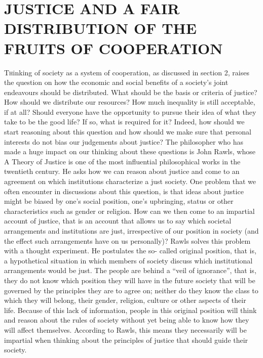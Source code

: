 \documentclass[11pt]{article}
\begin{document}
\section{JUSTICE AND A FAIR DISTRIBUTION OF THE FRUITS OF COOPERATION}
\lettrine[lines=3]{T}hinking of society as a system of cooperation, as discussed in section 2,
raises the question on how the economic and social benefits of a society’s joint endeavours should be distributed. What should be the basis or criteria of justice? How should we distribute our resources? How much inequality is still acceptable, if at all? Should everyone have the opportunity to pursue their idea of what they take to be the good life? If so, what is required for it? Indeed, how should we start reasoning about this question and how should we make sure that personal interests do not bias our judgements about justice?
The philosopher who has made a huge impact on our thinking about these questions is John Rawls, whose A Theory of Justice \parencite{Rawls1971} is one of the most influential philosophical works in the twentieth century. He asks how we can reason about justice and come to an agreement on which institutions characterize a just society. One problem that we often encounter in discussions about this question, is that ideas about justice might be biased by one’s social position, one’s upbringing, status or other characteristics such as gender or religion. How can we then come to an impartial account of justice, that is an account that allows us to say which societal arrangements and institutions are just, irrespective of our position in society (and the effect such arrangements have on us personally)?
Rawls solves this problem with a thought experiment. He postulates the so-
called original position, that is, a hypothetical situation in which members of society discuss which institutional arrangements would be just. The people are behind a “veil of ignorance”, that is, they do not know which position they will have in the future society that will be governed by the principles they are to agree on; neither do they know the class to which they will belong, their gender, religion,
culture or other aspects of their life. Because of this lack of information, people in this original position will think and reason about the rules of society without yet being able to know how they will affect themselves. According to Rawls, this means they necessarily will be impartial when thinking about the principles of justice that should guide their society.
\end{document}
